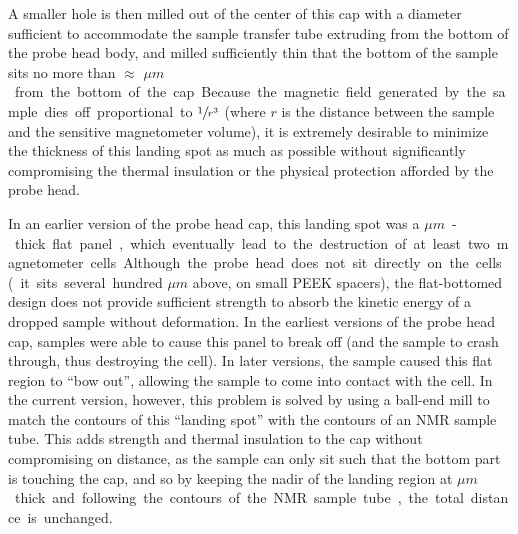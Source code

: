 \documentclass[PaulGanssle-Thesis.tex]{subfiles}
\begin{document}
A smaller hole is then milled out of the center of this cap with a diameter sufficient to accommodate the sample transfer tube extruding from the bottom of the probe head body, and milled sufficiently thin that the bottom of the sample sits no more than $\approx$ \unit[100-500]{$\mu m$} from the bottom of the cap. Because the magnetic field generated by the sample dies off proportional to $\sfrac{1}{r^3}$ (where $r$ is the distance between the sample and the sensitive magnetometer volume), it is extremely desirable to minimize the thickness of this landing spot as much as possible without significantly compromising the thermal insulation or the physical protection afforded by the probe head.

In an earlier version of the probe head cap, this landing spot was a \unit[100-200]{$\mu m$}-thick flat panel, which eventually lead to the destruction of at least two magnetometer cells. Although the probe head does not sit directly on the cells (it sits several hundred $\mu m$ above, on small PEEK spacers), the flat-bottomed design does not provide sufficient strength to absorb the kinetic energy of a dropped sample without deformation. In the earliest versions of the probe head cap, samples were able to cause this panel to break off (and the sample to crash through, thus destroying the cell). In later versions, the sample caused this flat region to ``bow out'', allowing the sample to come into contact with the cell. In the current version, however, this problem is solved by using a ball-end mill to match the contours of this ``landing spot'' with the contours of an NMR sample tube. This adds strength and thermal insulation to the cap without compromising on distance, as the sample can only sit such that the bottom part is touching the cap, and so by keeping the nadir of the landing region at \unit[100-200]{$\mu m$} thick and following the contours of the NMR sample tube, the total distance is unchanged.
\end{document}
